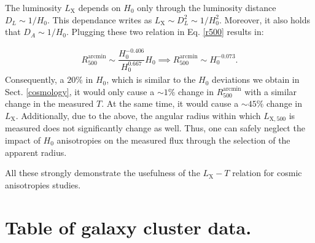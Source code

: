 \documentclass{aa}   %
\begin{document}
The luminosity $L_{\text{X}}$ depends on $H_0$ only through the luminosity distance $D_L\sim 1/H_0$. This dependance writes as $L_{\text{X}}\sim D_L^2\sim 1/H_0^2$. Moreover, it also holds that $D_A\sim 1/H_0$. Plugging these two relation in Eq. \ref{r500} results in:

\begin{equation}
\begin{aligned}
R_{500}^{\text{arcmin}}\sim \dfrac{H_0^{-0.406}}{H_0^{0.667}} H_0 \implies R_{500}^{\text{arcmin}}\sim H_0^{-0.073}.
\label{r500-2}
\end{aligned}
\end{equation}
Consequently, a $20\%$ in $H_0$, which is similar to the $H_0$ deviations we obtain in Sect. \ref{cosmology}, it would only cause a $\sim 1\%$ change in $R_{500}^{\text{arcmin}}$ with a similar change in the measured $T$. At the same time, it would cause a $\sim45\%$ change in $L_{\text{X}}$. Additionally, due to the above, the angular radius within which $L_{\text{X},500}$ is measured does not significantly change as well. Thus, one can safely neglect the impact of $H_0$ anisotropies on the measured flux through the selection of the apparent radius. 

All these strongly demonstrate the usefulness of the $L_{\text{X}}-T$ relation for cosmic anisotropies studies.






\clearpage



\section{Table of galaxy cluster data.}
\end{document}
